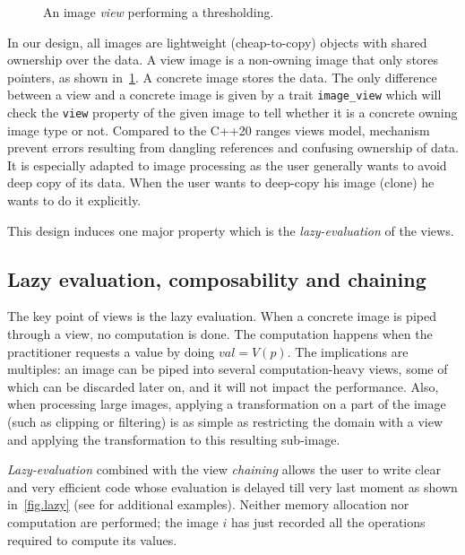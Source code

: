 \begin{figure}[htbp]
  \centering
  \begin{minipage}{\linewidth}
    
  \end{minipage}
  \caption{An image \emph{view} performing a thresholding.}
  \label{fig.view.threshold}
\end{figure}

In our design, all images are lightweight (cheap-to-copy) objects with shared ownership over the data. A view image is a
non-owning image that only stores pointers, as shown in~\cref{fig.view.threshold}. A concrete image stores the data. The
only difference between a view and a concrete image is given by a trait \texttt{image\_view} which will check the
\texttt{view} property of the given image to tell whether it is a concrete owning image type or not. Compared to the
C++20 ranges views model, mechanism prevent errors resulting from dangling references and confusing ownership of data.
It is especially adapted to image processing as the user generally wants to avoid deep copy of its data. When the user
wants to deep-copy his image (clone) he wants to do it explicitly.

This design induces one major property which is the \emph{lazy-evaluation} of the views.

\subsection{Lazy evaluation, composability and chaining}
\label{subsec:image.views.lazy.eval}

The key point of views is the lazy evaluation. When a concrete image is piped through a view, no computation is done.
The computation happens when the practitioner requests a value by doing \(val = V(p)\). The implications are multiples:
an image can be piped into several computation-heavy views, some of which can be discarded later on, and it will not
impact the performance. Also, when processing large images, applying a transformation on a part of the image (such as
clipping or filtering) is as simple as restricting the domain with a view and applying the transformation to this
resulting sub-image.

\emph{Lazy-evaluation} combined with the view \emph{chaining} allows the user to write clear and very efficient code
whose evaluation is delayed till very last moment as shown in~\cref{fig.lazy} (see \parencite{geraud.2018.gtgdmm} for
additional examples). Neither memory allocation nor computation are performed; the image \(i\) has just recorded all the
operations required to compute its values.

